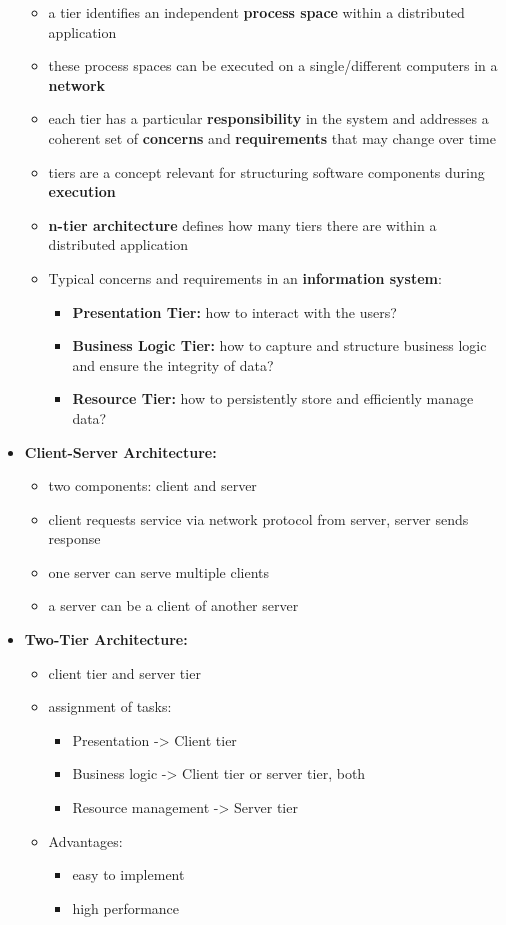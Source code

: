 \documentclass[ieeetran]{article}
\begin{document}
\begin{itemize}
\begin{itemize}
	\item a tier identifies an independent \textbf{process space} within a distributed application
	\item these process spaces can be executed on a single/different computers in a \textbf{network}
	\item each tier has a particular \textbf{responsibility} in the system and addresses a coherent set of \textbf{concerns} and \textbf{requirements} that may change over time
	\item tiers are a concept relevant for structuring software components during \textbf{execution}
	\item \textbf{n-tier architecture} defines how many tiers there are within a distributed application
	\item Typical concerns and requirements in an \textbf{information system}:
		\begin{itemize}
		  \item \textbf{Presentation Tier:} how to interact with the users?
		\item \textbf{Business Logic Tier:} how to capture and structure business logic and ensure the integrity of data?
		\item \textbf{Resource Tier:} how to persistently store and efficiently manage data?
		\end{itemize}
	\end{itemize}

\item \textbf{Client-Server Architecture:}
        \begin{itemize}
          \item two components: client and server
	\item client requests service via network protocol from server, server sends response
	\item one server can serve multiple clients
	\item a server can be a client of another server
        \end{itemize}

\item \textbf{Two-Tier Architecture:}
	\begin{itemize}
	  \item client tier and server tier
	\item assignment of tasks:
	\begin{itemize}
	  \item Presentation -> Client tier
	\item Business logic -> Client tier or server tier, both
	\item Resource management -> Server tier
	\end{itemize}
\item Advantages:
	\begin{itemize}
	  \item easy to implement
	\item high performance
	\end{itemize}
	\end{itemize}


\end{itemize}
\end{document}
